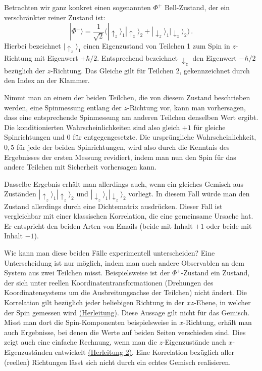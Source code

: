 Betrachten wir ganz konkret einen sogenannten $\Phi^+$ Bell-Zustand, der ein verschr\"ankter
reiner Zustand ist:
\begin{equation}
            | \Phi^+ \rangle = \frac{1}{\sqrt{2}} 
            \big(  | \uparrow_z \rangle_1 |\uparrow_z \rangle_2 +  | \downarrow_z \rangle_1 |\downarrow_z \rangle_2 \big) \, .
\end{equation}
Hierbei bezeichnet $|\uparrow_z\rangle_1$ einen Eigenzustand von Teilchen 1 zum Spin in
$z$-Richtung mit Eigenwert $+\hbar/2$. Entsprechend bezeichnet $\downarrow_z$ den Eigenwert $-\hbar/2$
bez\"uglich der $z$-Richtung. Das Gleiche gilt f\"ur Teilchen 2, gekennzeichnet durch den Index an der Klammer. 

Nimmt man an einem der beiden Teilchen, die von diesem Zustand beschrieben werden, eine Spinmessung
entlang der $z$-Richtung
vor, kann man vorhersagen, dass eine entsprechende Spinmessung am anderen Teilchen
denselben Wert ergibt. Die konditionierten Wahrscheinlichkeiten sind
also gleich $+1$ f\"ur gleiche Spinrichtungen und $0$ f\"ur entgegengesetzte. Die
urspr\"ungliche Wahrscheinlichkeit, $0,5$ f\"ur jede der beiden Spinrichtungen, wird also
durch die Kenntnis des Ergebnisses der ersten Messung revidiert, indem man nun den
Spin f\"ur das andere Teilchen mit Sicherheit vorhersagen kann.

Dasselbe Ergebnis erh\"alt man allerdings auch, wenn ein gleiches Gemisch
aus Zust\"anden $| \uparrow_z \rangle_1 |\uparrow_z \rangle_2$ und 
$| \downarrow_z \rangle_1 |\downarrow_z \rangle_2$ vorliegt. In diesem Fall w\"urde man
den Zustand allerdings durch eine Dichtematrix ausdr\"ucken. Dieser Fall ist vergleichbar
mit einer klassischen Korrelation, die eine gemeinsame Ursache hat. Er entspricht den
beiden Arten von Emails (beide mit Inhalt $+1$ oder beide mit Inhalt $-1$). 

Wie kann man diese beiden F\"alle experimentell
unterscheiden? Eine Unterscheidung ist nur m\"oglich, indem man auch andere Observablen an
dem System aus zwei Teilchen misst. Beispielsweise ist der $\Phi^+$-Zustand ein Zustand, der
sich unter reellen Koordinatentransformationen (Drehungen des Koordinatensystems um die
Ausbreitungsachse der Teilchen) nicht
\"andert. Die Korrelation gilt bez\"uglich jeder beliebigen Richtung in der $xz$-Ebene, in 
welcher der Spin gemessen wird \hyperref[sec_Entanglement_A]{(Herleitung)}. Diese
Aussage gilt nicht f\"ur das Gemisch. Misst man dort die Spin-Komponenten beispielsweise
in $x$-Richtung, erh\"alt man auch Ergebnisse, bei denen die Werte auf beiden Seiten verschieden
sind. Dies zeigt auch eine einfache Rechnung, wenn man die $z$-Eigenzust\"ande nach 
$x$-Eigenzust\"anden entwickelt \hyperref[sec_Entanglement_B]{(Herleitung 2)}. 
Eine Korrelation bez\"uglich aller (reellen) Richtungen l\"asst sich
nicht durch ein echtes Gemisch realisieren.

